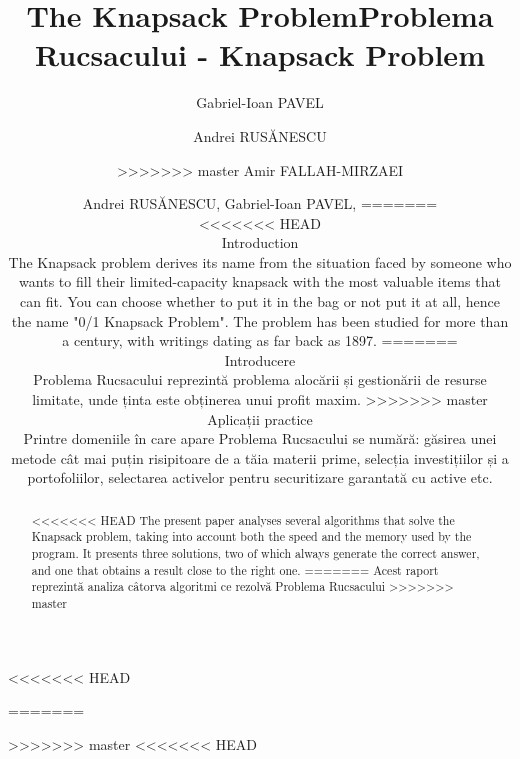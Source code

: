 \documentclass[runningheads]{llncs}
\begin{document}
%
<<<<<<< HEAD
\title{The Knapsack Problem}
=======
\title{Problema Rucsacului - Knapsack Problem}
>>>>>>> master
%
%
<<<<<<< HEAD
\author{Andrei RUSĂNESCU,
 Gabriel-Ioan PAVEL,
=======
\author{Gabriel-Ioan PAVEL \and
Andrei RUSĂNESCU \and
>>>>>>> master
Amir FALLAH-MIRZAEI}
%
%
\maketitle              %
%
\begin{abstract}
<<<<<<< HEAD
The present paper analyses several algorithms that solve the Knapsack problem,
taking into account both the speed and the memory used by the program. It
presents three solutions, two of which always generate the correct answer, and
one that obtains a result close to the right one.
=======
Acest raport reprezintă analiza câtorva algoritmi ce rezolvă Problema Rucsacului
>>>>>>> master

\end{abstract}
%
%
%
<<<<<<< HEAD
\section{Introduction}
The Knapsack problem derives its name from the situation faced by someone who wants
to fill their limited-capacity knapsack with the most valuable items that can fit.
You can choose whether to put it in the bag or not put it at all, hence the name
"0/1 Knapsack Problem". The problem has been studied for more than a century, with
writings dating as far back as 1897. 
=======
\section{Introducere}
Problema Rucsacului reprezintă problema alocării și gestionării de resurse limitate,
unde ținta este obținerea unui profit maxim.
>>>>>>> master

\subsubsection{Aplicații practice} Printre domeniile în care apare Problema
Rucsacului se numără: găsirea unei metode cât mai puțin risipitoare de a tăia
materii prime, selecția investițiilor și a portofoliilor, selectarea activelor
pentru securitizare garantată cu active etc.

}
\end{document}
